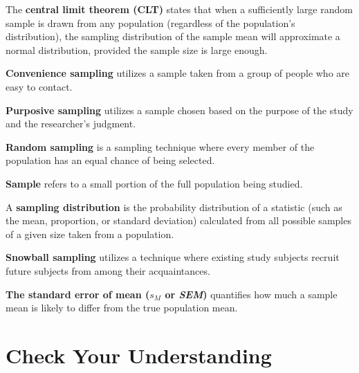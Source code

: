 \documentclass[
  letterpaper,
  DIV=11,
  numbers=noendperiod]{scrreprt}
\begin{document}

The \textbf{central limit theorem (CLT)} states that when a sufficiently
large random sample is drawn from any population (regardless of the
population's distribution), the sampling distribution of the sample mean
will approximate a normal distribution, provided the sample size is
large enough.

\textbf{Convenience sampling} utilizes a sample taken from a group of
people who are easy to contact.

\textbf{Purposive sampling} utilizes a sample chosen based on the
purpose of the study and the researcher's judgment.

\textbf{Random sampling} is a sampling technique where every member of
the population has an equal chance of being selected.

\textbf{Sample} refers to a small portion of the full population being
studied.

A \textbf{sampling distribution} is the probability distribution of a
statistic (such as the mean, proportion, or standard deviation)
calculated from all possible samples of a given size taken from a
population.

\textbf{Snowball sampling} utilizes a technique where existing study
subjects recruit future subjects from among their acquaintances.

\textbf{The standard error of mean (\(s_M\) or \emph{SEM})} quantifies
how much a sample mean is likely to differ from the true population
mean.

\section*{Check Your Understanding}\label{check-your-understanding-5}

\end{document}
